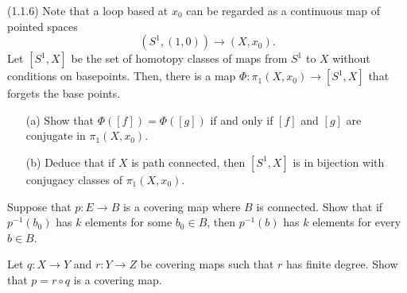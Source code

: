 \documentclass[12pt]{article}
\begin{document}
\begin{problab}{4}
(1.1.6) Note that a loop based at \( x_0 \) can be regarded as a continuous map of pointed spaces
\[
(S^1, (1, 0)) \to (X, x_0).
\]
Let \( [S^1, X] \) be the set of homotopy classes of maps from \( S^1 \) to \( X \) without conditions on basepoints. Then, there is a map \( \Phi : \pi_1(X, x_0) \to [S^1, X] \) that forgets the base points.
\begin{itemize}
    \item[(a)] Show that \( \Phi([f]) = \Phi([g]) \) if and only if \( [f] \) and \( [g] \) are conjugate in \( \pi_1(X, x_0) \).
    \item[(b)] Deduce that if \( X \) is path connected, then \( [S^1, X] \) is in bijection with conjugacy classes of \( \pi_1(X, x_0) \).
\end{itemize}
\end{problab}
\begin{solu}

\end{solu}
\newpage

\begin{problab}{5}
Suppose that \( p : E \to B \) is a covering map where \( B \) is connected. Show that if \( p^{-1}(b_0) \) has \( k \) elements for some \( b_0 \in B \), then \( p^{-1}(b) \) has \( k \) elements for every \( b \in B \).
\end{problab}
\begin{solu}

\end{solu}
\newpage

\begin{problab}{6}
Let \( q : X \to Y \) and \( r : Y \to Z \) be covering maps such that \( r \) has finite degree. Show that \( p = r \circ q \) is a covering map.
\end{problab}
\begin{solu}

\end{solu}
\end{document}
